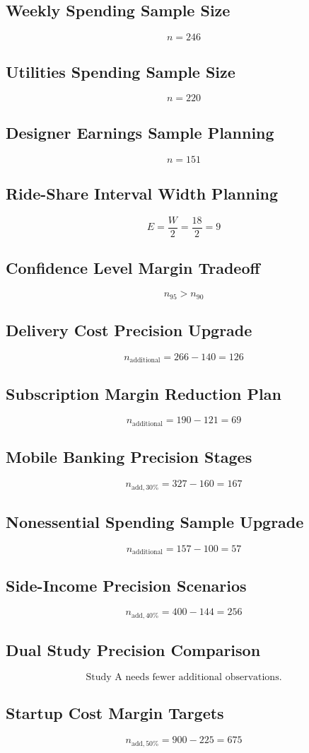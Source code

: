 \subsection*{Weekly Spending Sample Size}
\[n = 246\]

\subsection*{Utilities Spending Sample Size}
\[n = 220\]

\subsection*{Designer Earnings Sample Planning}
\[n = 151\]

\subsection*{Ride-Share Interval Width Planning}
\[E = \frac{W}{2} = \frac{18}{2} = 9\]

\subsection*{Confidence Level Margin Tradeoff}
\[n_{95} > n_{90}\]

\subsection*{Delivery Cost Precision Upgrade}
\[n_{\text{additional}} = 266 - 140 = 126\]

\subsection*{Subscription Margin Reduction Plan}
\[n_{\text{additional}} = 190 - 121 = 69\]

\subsection*{Mobile Banking Precision Stages}
\[n_{\text{add},30\%} = 327 - 160 = 167\]

\subsection*{Nonessential Spending Sample Upgrade}
\[n_{\text{additional}} = 157 - 100 = 57\]

\subsection*{Side-Income Precision Scenarios}
\[n_{\text{add},40\%} = 400 - 144 = 256\]

\subsection*{Dual Study Precision Comparison}
\[\text{Study A needs fewer additional observations.}\]

\subsection*{Startup Cost Margin Targets}
\[n_{\text{add},50\%} = 900 - 225 = 675\]

